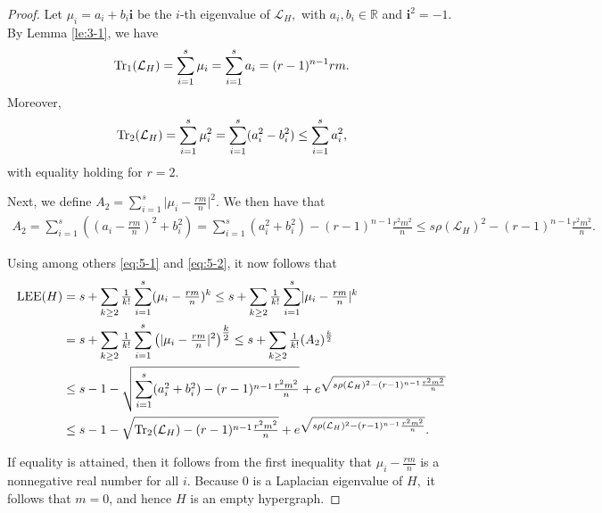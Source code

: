 \documentclass[11pt]{article}
\def\LEE{\mathop{\rm LEE }\nolimits}
\def\Tr{\mathop{\rm Tr }\nolimits}
\begin{document}
\begin{proof} Let $\mu_{i}=a_{i}+b_{i}\mathbf{i}$ be the $i$-th eigenvalue of $\mathcal{L}_{H},$ with $a_{i}, b_{i}\in \mathbb{R}$ and $\mathbf{i}^{2}=-1.$ By Lemma \ref{le:3-1}, we have
$$\Tr_1(\mathcal{L}_{H})=\sum_{i=1}^{s}\mu_{i}=\sum_{i=1}^{s}a_{i}=(r-1)^{n-1}rm.$$
Moreover, 
\begin{align}\label{eq:5-1}
\Tr_2(\mathcal{L}_{H})=\sum_{i=1}^{s}\mu_{i}^{2}=\sum_{i=1}^{s}(a_{i}^{2}-b_{i}^{2}) \leq \sum_{i=1}^{s}a_{i}^{2},
\end{align}
with equality holding for $r=2$.

Next, we define $A_2=\sum_{i=1}^{s}\lvert \mu_{i}-\tfrac{rm}{n}\rvert^{2}$. We then have that
\begin{align}\label{eq:5-2}
A_2=\sum_{i=1}^{s}\left((a_{i}-\tfrac{rm}{n})^{2} +b_{i}^{2}\right)
= \sum_{i=1}^{s}(a_{i}^{2}+b_{i}^{2})-(r-1)^{n-1}\tfrac{r^{2}m^{2}}{n}
\leq s\rho(\mathcal{L}_{H})^{2}-(r-1)^{n-1}\tfrac{r^{2}m^{2}}{n}.
\end{align}

Using among others \eqref{eq:5-1} and \eqref{eq:5-2}, it now follows that
\begin{align*}
\LEE(H)&=s+\sum\limits_{k\geq 2}\tfrac{1}{k!}\sum_{i=1}^{s}(\mu_{i}-\tfrac{rm}{n})^{k}\leq s+\sum\limits_{k\geq 2}\tfrac{1}{k!}\sum_{i=1}^{s}\lvert \mu_{i}-\tfrac{rm}{n}\rvert^{k}\\
&= s+\sum\limits_{k\geq 2}\tfrac{1}{k!}\sum_{i=1}^{s}\left(\lvert \mu_{i}-\tfrac{rm}{n}\rvert^{2}\right)^{\tfrac{k}{2}}\leq s+\sum\limits_{k\geq 2}\tfrac{1}{k!}(A_2)^{\frac{k}{2}}\\%
&\leq s-1-\sqrt{\sum_{i=1}^{s}(a_{i}^{2}+b_{i}^{2})-(r-1)^{n-1}\tfrac{r^{2}m^{2}}{n}}
+e^{\sqrt{s\rho(\mathcal{L}_{H})^{2}-(r-1)^{n-1}\frac{r^{2}m^{2}}{n}}}\\&
\leq s-1-\sqrt{\Tr_{2}(\mathcal{L}_{H})-(r-1)^{n-1}\tfrac{r^{2}m^{2}}{n}}+e^{\sqrt{s\rho(\mathcal{L}_{H})^{2}-(r-1)^{n-1}\frac{r^{2}m^{2}}{n}}}.
\end{align*}

If equality is attained, then it follows from the first inequality that $\mu_{i}-\tfrac{rm}{n}$ is a nonnegative real number for all $i$. Because $0$ is a Laplacian eigenvalue of $H,$ it follows that $m=0$, and hence $H$ is an empty hypergraph.
\end{proof}
\end{document}
